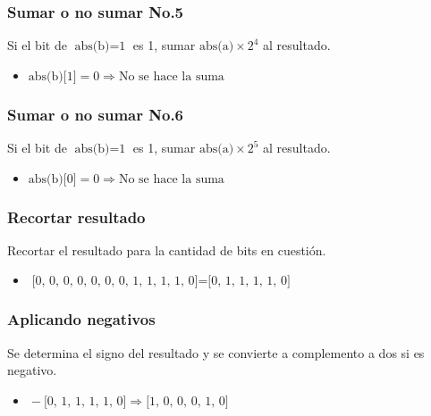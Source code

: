 \documentclass{beamer}
\begin{document}
\begin{frame}
\frametitle{Sumar o no sumar No.5}
Si el bit de $\text{abs(b)}=\text{1}$ es 1, sumar $\text{abs(a)}\times\text{2}^{\text{4}}$ al resultado.
\begin{itemize}
\item $\text{abs(b)[1]}=\text{0}\Longrightarrow\text{No se hace la suma}$
\end{itemize}
\end{frame}
\begin{frame}
\frametitle{Sumar o no sumar No.6}
Si el bit de $\text{abs(b)}=\text{1}$ es 1, sumar $\text{abs(a)}\times\text{2}^{\text{5}}$ al resultado.
\begin{itemize}
\item $\text{abs(b)[0]}=\text{0}\Longrightarrow\text{No se hace la suma}$
\end{itemize}
\end{frame}
\begin{frame}
\frametitle{Recortar resultado}
Recortar el resultado para la cantidad de bits en cuestión.
\begin{itemize}
\item $\text{[0, 0, 0, 0, 0, 0, 0, 1, 1, 1, 1, 0]}=\text{[0, 1, 1, 1, 1, 0]}$
\end{itemize}
\end{frame}
\begin{frame}
\frametitle{Aplicando negativos}
Se determina el signo del resultado y se convierte a complemento a dos si es negativo.
\begin{itemize}
\item $\text{}-\text{[0, 1, 1, 1, 1, 0]}\Longrightarrow\text{[1, 0, 0, 0, 1, 0]}$
\end{itemize}
\end{frame}

\begin{frame}
\maketitle
{}
\end{frame}
\end{document}

